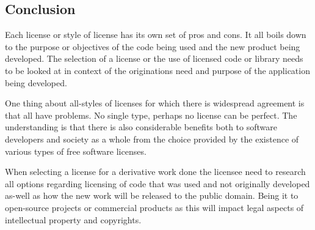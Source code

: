 \documentclass[12pt, onecolumn]{witseiepaper}
\begin{document}

\subsection{Conclusion}

Each license or style of license has its own set of pros and cons.  It all boils down to the purpose or objectives of the code being used and the new product being developed.  The selection of a license or the use of licensed code or library needs to be looked at in context of the originations need and purpose of the application being developed.  

One thing about all-styles of licenses for which there is widespread agreement is that all have problems. No single type, perhaps no license can be perfect. The understanding is that there is also considerable benefits both to software developers and society as a whole from the choice provided by the existence of various types of free software licenses.

When selecting a license for a derivative work done the licensee need to research all options regarding licensing of code that was used and not originally developed as-well as how the new work will be released to the public domain.  Being it to open-source projects or commercial products as this will impact legal aspects of intellectual property and copyrights.

\newpage


\end{document}
